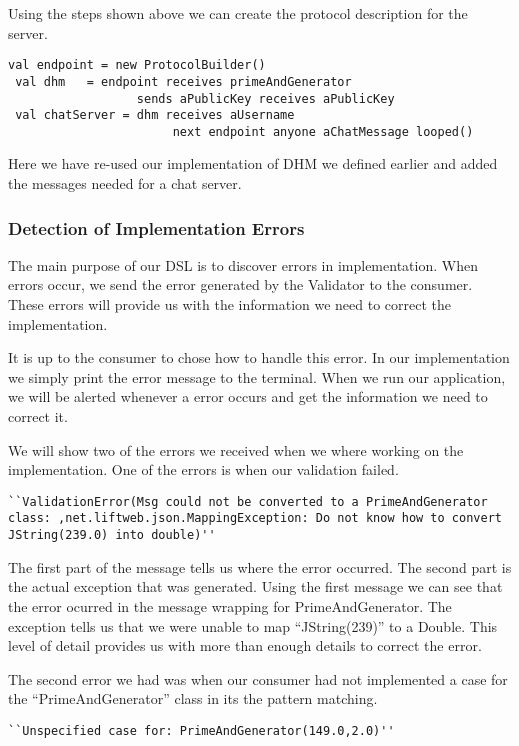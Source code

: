 Using the steps shown above we can create the protocol description for the server. 
\begin{lstlisting}[style=myScalastyle]
 val endpoint = new ProtocolBuilder()
 val dhm   = endpoint receives primeAndGenerator 
                  sends aPublicKey receives aPublicKey
 val chatServer = dhm receives aUsername 
                       next endpoint anyone aChatMessage looped()
\end{lstlisting}
Here we have re-used our implementation of DHM we defined earlier and added the messages needed for a chat server.

\subsubsection{Detection of Implementation Errors}
The main purpose of our DSL is to discover errors in implementation. When errors occur, we send the error generated by the Validator to the consumer. These errors will provide us with the information  we need to correct the implementation. 

It is up to the consumer to chose how to handle this error. In our implementation we simply print the error message to the terminal. When we run our application, we will be alerted whenever a error occurs and get the information we need to correct it.

We will show two of the errors we received when we where working on the implementation. One of the errors is when our validation failed. 
\begin{lstlisting}[style=myScalastyle]
  ``ValidationError(Msg could not be converted to a PrimeAndGenerator class: ,net.liftweb.json.MappingException: Do not know how to convert JString(239.0) into double)''
\end{lstlisting}
The first part of the message tells us where the error occurred. The second part is the actual exception that was generated. Using the first message we can see that the error ocurred in the message wrapping for PrimeAndGenerator. The exception tells us that we were unable to map ``JString(239)'' to a Double. This level of detail provides us with more than enough details to correct the error.

The second error we had was when our consumer had not implemented a case for the ``PrimeAndGenerator'' class in its the pattern matching.
\begin{lstlisting}[style=myScalastyle]
  ``Unspecified case for: PrimeAndGenerator(149.0,2.0)''
\end{lstlisting}

